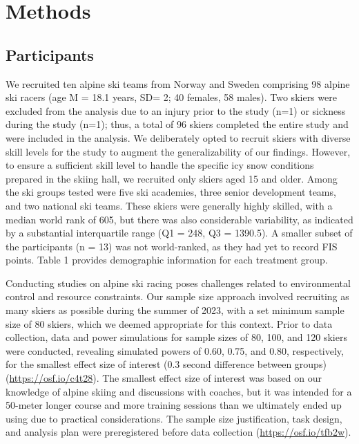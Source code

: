 \documentclass{article}
\begin{document}
\section{Methods}

\subsection{Participants}
We recruited ten alpine ski teams from Norway and Sweden comprising 98 alpine ski racers (age M = 18.1 years, SD= 2; 40 females, 58 males). Two skiers were excluded from the analysis due to an injury prior to the study (n=1) or sickness during the study (n=1); thus, a total of 96 skiers completed the entire study and were included in the analysis. We deliberately opted to recruit skiers with diverse skill levels for the study to augment the generalizability of our findings. However, to ensure a sufficient skill level to handle the specific icy snow conditions prepared in the skiing hall, we recruited only skiers aged 15 and older. Among the ski groups tested were five ski academies, three senior development teams, and two national ski teams. These skiers were generally highly skilled, with a median world rank of 605, but there was also considerable variability, as indicated by a substantial interquartile range (Q1 = 248, Q3 = 1390.5). A smaller subset of the participants (n = 13) was not world-ranked, as they had yet to record FIS points. Table 1 provides demographic information for each treatment group.

Conducting studies on alpine ski racing poses challenges related to environmental control and resource constraints. Our sample size approach involved recruiting as many skiers as possible during the summer of 2023, with a set minimum sample size of 80 skiers, which we deemed appropriate for this context. Prior to data collection, data and power simulations for sample sizes of 80, 100, and 120 skiers were conducted, revealing simulated powers of 0.60, 0.75, and 0.80, respectively, for the smallest effect size of interest (0.3 second difference between groups) (\url{https://osf.io/c4t28}). The smallest effect size of interest was based on our knowledge of alpine skiing and discussions with coaches, but it was intended for a 50-meter longer course and more training sessions than we ultimately ended up using due to practical considerations. The sample size justification, task design, and analysis plan were preregistered before data collection (\url{https://osf.io/tfb2w}).
\end{document}
